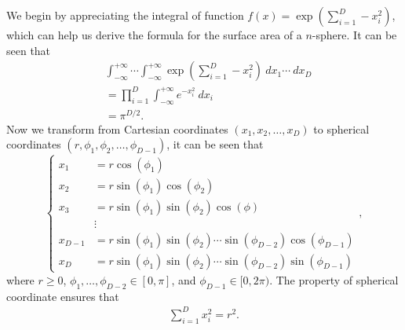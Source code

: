 \begin{answer}{}
	We begin by appreciating the integral of function $f(x) = \exp(\sum_{i = 1}^{D} - x_i^2)$, which can help us derive the formula for the surface area of a $n$-sphere. It can be seen that
	\begin{align}\label{1.18eqn1}
		&\int_{-\infty}^{+\infty} \cdots \int_{-\infty}^{+\infty} \exp(\sum_{i = 1}^{D} - x_i^2) \ dx_1 \cdots\ dx_D\\
		&= \prod_{i = 1}^{D} \int_{-\infty}^{+\infty} e^{-x_i^2}\ dx_i\\
		&= \pi^{D/2}.
	\end{align}
	Now we transform from Cartesian coordinates $(x_1, x_2, \ldots, x_D)$ to spherical coordinates $(r, \phi_1, \phi_2, \ldots, \phi_{D - 1})$, it can be seen that
	\begin{equation}
		\left\{
			\begin{aligned}
				x_1 &= r\cos(\phi_1)\\
				x_2 &= r\sin(\phi_1)\cos(\phi_2)\\
				x_3 &= r\sin(\phi_1)\sin(\phi_2)\cos(\phi)\\
				&\vdots\\
				x_{D - 1} &= r\sin(\phi_1)\sin(\phi_2)\cdots\sin(\phi_{D-2})\cos(\phi_{D-1})\\
				x_D &= r\sin(\phi_1)\sin(\phi_2)\cdots\sin(\phi_{D-2})\sin(\phi_{D-1})
			\end{aligned}
		\right. ,
	\end{equation}
	where $r \geq 0$, $\phi_1, \ldots, \phi_{D - 2} \in [0, \pi]$, and $\phi_{D - 1} \in [0, 2\pi)$. The property of spherical coordinate ensures that
	\begin{align}
		\sum_{i = 1}^{D} x_i^2 = r^2.
	\end{align}
	

\end{answer}
